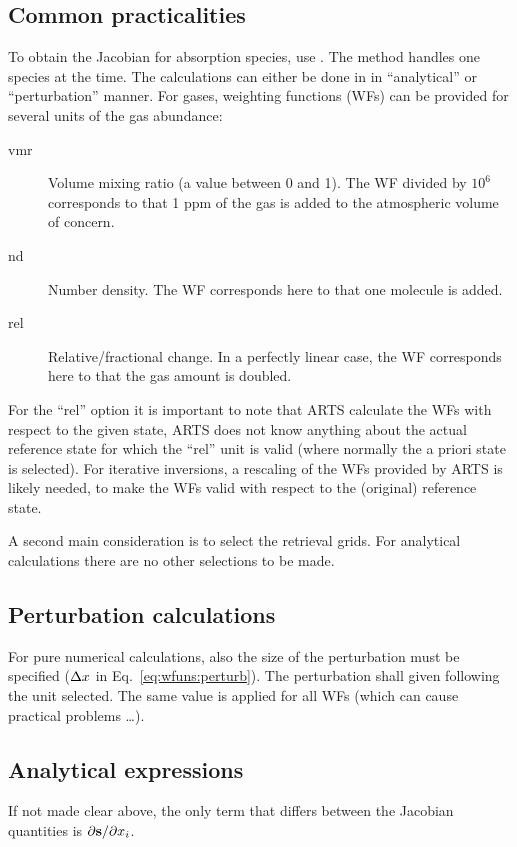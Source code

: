 \subsection{Common practicalities}
%
To obtain the Jacobian for absorption species, use
. The method handles one species at the time.
The calculations can either be done in in ``analytical'' or ``perturbation''
manner. For gases, weighting functions (WFs) can be provided for several units
of the gas abundance:
\begin{description}
\item[vmr] Volume mixing ratio (a value between 0 and 1). The WF divided by
  $10^6$ corresponds to that 1 ppm of the gas is added to the atmospheric
  volume of concern.
\item[nd] Number density. The WF corresponds here to that one molecule is added.
\item[rel] Relative/fractional change. In a perfectly linear case, the WF
  corresponds here to that the gas amount is doubled.
\end{description}
For the ``rel'' option it is important to note that ARTS
calculate the WFs with respect to the given state, ARTS does not know anything
about the actual reference state for which the ``rel'' unit is valid (where
normally the a priori state is selected). For iterative inversions, a rescaling
of the WFs provided by ARTS is likely needed, to make the WFs valid with
respect to the (original) reference state. 

A second main consideration is to select the retrieval grids. For analytical
calculations there are no other selections to be made. 


\subsection{Perturbation calculations}
%
For pure numerical calculations, also the size of the perturbation must be
specified ($\Delta x$ in Eq.~\ref{eq:wfuns:perturb}). The perturbation
shall given following the unit selected. The same value is applied for all WFs
(which can cause practical problems \dots).


\subsection{Analytical expressions}
%
If not made clear above, the only term that differs between the Jacobian
quantities is $\partial{\bf s}/\partial x_{i}$.

